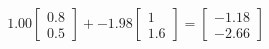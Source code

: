 \documentclass[preview]{standalone}
\begin{document}
\begin{align*}
1.00 \begin{bmatrix} 0.8 \\ 0.5 \end{bmatrix} + -1.98 \begin{bmatrix} 1 \\ 1.6 \end{bmatrix} = \begin{bmatrix} -1.18 \\ -2.66 \end{bmatrix}
\end{align*}
\end{document}
